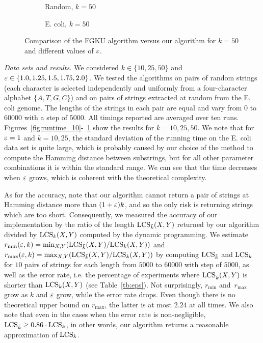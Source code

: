 \begin{figure}[ht!]
\centering   
    \begin{subfigure}{.5\textwidth}
        \centering
        \captionsetup{justification=centering}
        \caption{Random, $k = 50$}
    \end{subfigure}%
    \begin{subfigure}{0.5\textwidth}
        \centering
        \captionsetup{justification=centering}
        \caption{E. coli, $k = 50$}
    \end{subfigure}        
\caption{Comparison of the FGKU algorithm versus our algorithm for $k = 50$ and different values of $\varepsilon$.}
\label{fig:runtime_50}
\end{figure}

\textit{Data sets and results.}
We considered $k \in \{10, 25, 50\}$ and $\varepsilon \in \{1.0, 1.25, 1.5, 1.75, 2.0\}$. We tested the algorithms on pairs of random strings (each character is selected independently and uniformly from a four-character alphabet $\{A, T, G, C\}$) and on pairs of strings extracted at random from the E. coli genome. The lengths of the strings in each pair are equal and vary from $0$ to $60000$ with a step of $5000$. All timings reported are averaged over ten runs. Figures~\ref{fig:runtime_10}-~\ref{fig:runtime_50} show the results for $k = 10, 25, 50$. We note that for $\varepsilon = 1$ and $k = 10, 25$, the standard deviation of the running time on the E. coli data set is quite large, which is probably caused by our choice of the method to compute the Hamming distance between substrings, but for all other parameter combinations it is within the standard range. We can see that the time decreases when $\varepsilon$ grows, which is coherent with the theoretical complexity. 


As for the accuracy, note that our algorithm cannot return a pair of strings at Hamming distance more than $(1+\varepsilon) k$, and so the only risk is returning strings which are too short. Consequently, we measured the accuracy of our implementation by the ratio of the length $\mathrm{LCS}_{\tilde{k}}(X, Y)$ returned by our algorithm divided by $\mathrm{LCS}_{k}(X, Y)$ computed by the dynamic programming. We estimate $r_{\min}(\varepsilon, k) = \min_{X,Y}(\mathrm{LCS}_{\tilde{k}}(X,Y)/\mathrm{LCS}_{k}(X,Y))$ and $r_{\max}(\varepsilon, k) = \max_{X,Y}(\mathrm{LCS}_{\tilde{k}}(X,Y)/\mathrm{LCS}_{k}(X,Y))$
by computing $\mathrm{LCS}_{\tilde{k}}$ and $\mathrm{LCS}_{k}$ for $10$ pairs of strings for each length from $5000$ to $60000$ with step of $5000$, as well as the error rate, i.e. the percentage of experiments where $\mathrm{LCS}_{\tilde{k}}(X,Y)$ is shorter than $\mathrm{LCS}_{k}(X,Y)$ (see Table~\ref{tb:eps}). Not surprisingly, $r_{\min}$ and~$r_{\max}$ grow as $k$ and $\varepsilon$ grow, while the error rate drops. Even though there is no theoretical upper bound on $r_{\max}$, the latter is at most $2.24$ at all times. We also note that even in the cases when the error rate is non-negligible, $\mathrm{LCS}_{\tilde{k}} \ge 0.86 \cdot \mathrm{LCS}_{k}$, in other words, our algorithm returns a reasonable approximation of $\mathrm{LCS}_{k}$.


